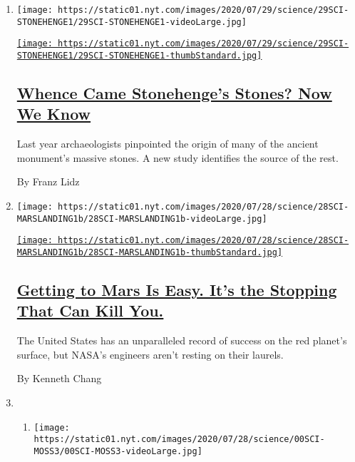 \begin{enumerate}
\def\labelenumi{\arabic{enumi}.}
\item
  \texttt{[image: https://static01.nyt.com/images/2020/07/29/science/29SCI-STONEHENGE1/29SCI-STONEHENGE1-videoLarge.jpg]}

  \href{/2020/07/29/science/stonehenge-archaeology-sarsens.html}{\texttt{[image: https://static01.nyt.com/images/2020/07/29/science/29SCI-STONEHENGE1/29SCI-STONEHENGE1-thumbStandard.jpg]}}

  \hypertarget{whence-came-stonehenges-stones-now-we-know}{%
  \subsection{\texorpdfstring{\href{/2020/07/29/science/stonehenge-archaeology-sarsens.html}{Whence
  Came Stonehenge's Stones? Now We
  Know}}{Whence Came Stonehenge's Stones? Now We Know}}\label{whence-came-stonehenges-stones-now-we-know}}

  Last year archaeologists pinpointed the origin of many of the ancient
  monument's massive stones. A new study identifies the source of the
  rest.

  By Franz Lidz
\item
  \texttt{[image: https://static01.nyt.com/images/2020/07/28/science/28SCI-MARSLANDING1b/28SCI-MARSLANDING1b-videoLarge.jpg]}

  \href{/2020/07/29/science/nasa-mars-perseverance-rover.html}{\texttt{[image: https://static01.nyt.com/images/2020/07/28/science/28SCI-MARSLANDING1b/28SCI-MARSLANDING1b-thumbStandard.jpg]}}

  \hypertarget{getting-to-mars-is-easy-its-the-stopping-that-can-kill-you}{%
  \subsection{\texorpdfstring{\href{/2020/07/29/science/nasa-mars-perseverance-rover.html}{Getting
  to Mars Is Easy. It's the Stopping That Can Kill
  You.}}{Getting to Mars Is Easy. It's the Stopping That Can Kill You.}}\label{getting-to-mars-is-easy-its-the-stopping-that-can-kill-you}}

  The United States has an unparalleled record of success on the red
  planet's surface, but NASA's engineers aren't resting on their
  laurels.

  By Kenneth Chang
\item
  \begin{enumerate}
  \def\labelenumii{\arabic{enumii}.}
  \item
    \texttt{[image: https://static01.nyt.com/images/2020/07/28/science/00SCI-MOSS3/00SCI-MOSS3-videoLarge.jpg]}


\end{enumerate}
\end{enumerate}
